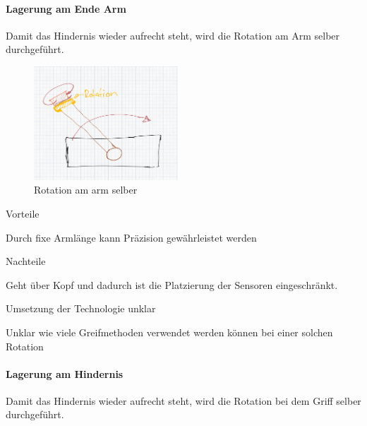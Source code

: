 \paragraph{Lagerung am Ende Arm}
Damit das Hindernis wieder aufrecht steht, wird die Rotation am Arm selber durchgeführt. 

\begin{figure}[h!]
        \centering
        \includegraphics[width=0.48\textwidth]{img/technologierecherche/Rotation/ueberkopf_griff_gelagert.jpg}
        \caption{Rotation am arm selber}
        \label{img:tech_ueberkopf_griff_gelagert}
\end{figure}

\begin{minipage}[t]{0.48\textwidth}
    \begin{items}
          \item [Vorteile]
          \item Durch fixe Armlänge kann Präzision gewährleistet werden
    \end{items}
\end{minipage}
\hfill
\begin{minipage}[t]{0.48\textwidth}
    \begin{items}
          \item [Nachteile]
          \item Geht über Kopf und dadurch ist die Platzierung der Sensoren eingeschränkt.
          \item Umsetzung der Technologie unklar
          \item Unklar wie viele Greifmethoden verwendet werden können bei einer solchen Rotation
    \end{items}
\end{minipage}
\newpage
\paragraph{Lagerung am Hindernis}
Damit das Hindernis wieder aufrecht steht, wird die Rotation bei dem Griff selber durchgeführt.


